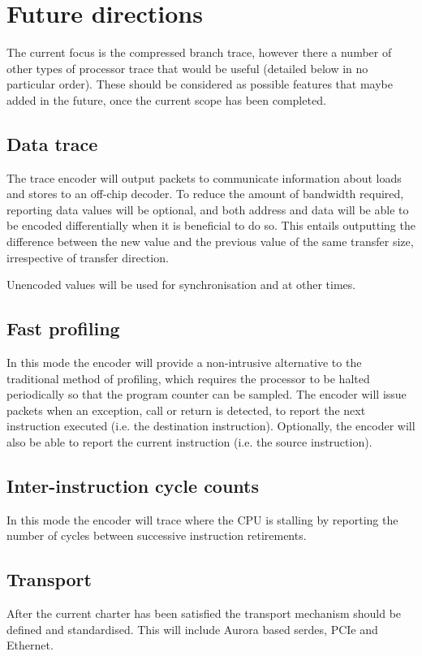 \chapter{Future directions} \label{Future}

The current focus is the compressed branch trace, however there a
number of other types of processor trace that would be useful 
(detailed below in no particular order). These
should be considered as possible features that maybe added in the future,
once the current scope has been completed.

\section{Data trace}

The trace encoder will output packets to communicate information
about loads and stores to an off-chip decoder.  To reduce the amount
of bandwidth required, reporting data values will be optional, and
both address and data will be able to be encoded differentially when
it is beneficial to do so.  This entails outputting the difference
between the new value and the previous value of the same transfer
size, irrespective of transfer direction.

Unencoded values will be used for synchronisation and at other times.

\section{Fast profiling}

In this mode the encoder will provide a non-intrusive alternative to
the traditional method of profiling, which requires the processor to
be halted periodically so that the program counter can be sampled.
The encoder will issue packets when an exception, call or return is
detected, to report the next instruction executed (i.e. the
destination instruction).  Optionally, the encoder will also be able to
report the current instruction (i.e. the source instruction).

\section{Inter-instruction cycle counts}

In this mode the encoder will trace where the CPU is stalling by
reporting the number of cycles between successive instruction
retirements.

\section{Transport}

After the current charter has been satisfied the transport mechanism
should be defined and standardised. This will include Aurora based
serdes, PCIe and Ethernet.
